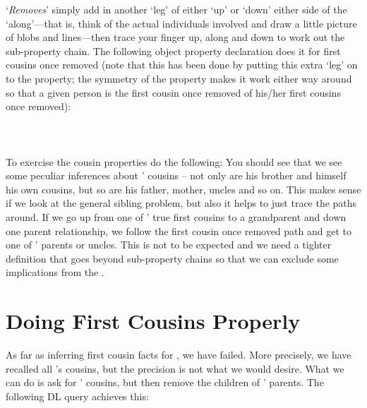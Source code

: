 `\emph{Removes}' simply add in another `leg' of either `up' or `down' either side of the `along'---that is, think of the actual individuals involved and draw a little picture of blobs and lines---then trace your finger up, along and down to work out the sub-property chain. The following object property declaration does it for first cousins once removed (note that this has been done by putting this extra `leg' on to the  property; the symmetry of the property makes it work either way around so that a given person is the first cousin once removed of his/her first cousins once removed): 
\\\\
\\\\
To exercise the cousin properties do the following:
You should see that we see some peculiar inferences about \rds' cousins -- not only are his brother and himself his own cousins, but so are his father, mother, uncles and so on. This makes sense if we look at the general sibling problem, but also it helps to just trace the paths around. If we go up from one of \rds' true first cousins to a grandparent and down one parent relationship, we follow the first cousin once removed path and get to one of \rds' parents or uncles. This is not to be expected and we need a tighter definition that goes beyond sub-property chains so that we can exclude some implications from the \fhkb.

\section{Doing First Cousins Properly}

As far as inferring first cousin facts for \rds, we have failed. More precisely, we have recalled all \rds's cousins, but the precision is not what we would desire. What we can do is ask for \rds' cousins, but then remove the children of \rds' parents. The following DL query achieves this:

